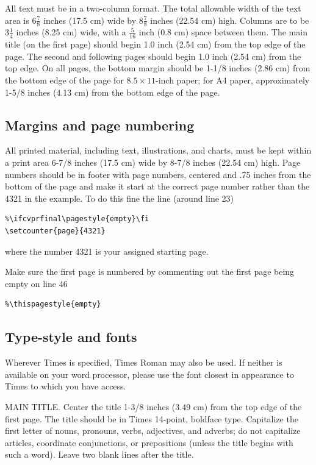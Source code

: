 \documentclass[10pt,twocolumn,letterpaper]{article}
\begin{document}
All text must be in a two-column format. The total allowable width of the
text area is $6\frac78$ inches (17.5 cm) wide by $8\frac78$ inches (22.54
cm) high. Columns are to be $3\frac14$ inches (8.25 cm) wide, with a
$\frac{5}{16}$ inch (0.8 cm) space between them. The main title (on the
first page) should begin 1.0 inch (2.54 cm) from the top edge of the
page. The second and following pages should begin 1.0 inch (2.54 cm) from
the top edge. On all pages, the bottom margin should be 1-1/8 inches (2.86
cm) from the bottom edge of the page for $8.5 \times 11$-inch paper; for A4
paper, approximately 1-5/8 inches (4.13 cm) from the bottom edge of the
page.

\subsection{Margins and page numbering}

All printed material, including text, illustrations, and charts, must be kept
within a print area 6-7/8 inches (17.5 cm) wide by 8-7/8 inches (22.54 cm)
high.  Page numbers should be in footer with page numbers, centered and .75
inches from the bottom of the page and make it start at the correct page
number rather than the 4321 in the example.  To do this fine the line (around
line 23)
\begin{verbatim}
%\ifcvprfinal\pagestyle{empty}\fi
\setcounter{page}{4321}
\end{verbatim}
where the number 4321 is your assigned starting page.

Make sure the first page is numbered by commenting out the first page being
empty on line 46
\begin{verbatim}
%\thispagestyle{empty}
\end{verbatim}


\subsection{Type-style and fonts}

Wherever Times is specified, Times Roman may also be used. If neither is
available on your word processor, please use the font closest in
appearance to Times to which you have access.

MAIN TITLE. Center the title 1-3/8 inches (3.49 cm) from the top edge of
the first page. The title should be in Times 14-point, boldface type.
Capitalize the first letter of nouns, pronouns, verbs, adjectives, and
adverbs; do not capitalize articles, coordinate conjunctions, or
prepositions (unless the title begins with such a word). Leave two blank
lines after the title.
\end{document}
